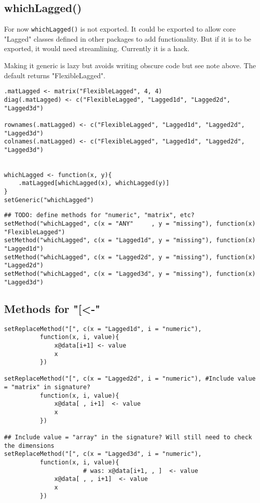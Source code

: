 \documentclass[11pt,a4paper]{article}
\begin{document}
\subsection{whichLagged()}
\label{sec:orgeae8383}

For now \texttt{whichLagged()} is not exported. It could be exported to allow core "Lagged" classes
defined in other packages to add functionality. But if it is to be exported, it would need
streamlining. Currently it is a hack.

Making it generic is lazy but avoids writing obscure code but see note above.
The default returns "FlexibleLagged".
\begin{verbatim}
.matLagged <- matrix("FlexibleLagged", 4, 4)
diag(.matLagged) <- c("FlexibleLagged", "Lagged1d", "Lagged2d", "Lagged3d")

rownames(.matLagged) <- c("FlexibleLagged", "Lagged1d", "Lagged2d", "Lagged3d")
colnames(.matLagged) <- c("FlexibleLagged", "Lagged1d", "Lagged2d", "Lagged3d")


whichLagged <- function(x, y){
    .matLagged[whichLagged(x), whichLagged(y)]
}
setGeneric("whichLagged")
\end{verbatim}

\begin{verbatim}
## TODO: define methods for "numeric", "matrix", etc?
setMethod("whichLagged", c(x = "ANY"     , y = "missing"), function(x) "FlexibleLagged")
setMethod("whichLagged", c(x = "Lagged1d", y = "missing"), function(x) "Lagged1d")
setMethod("whichLagged", c(x = "Lagged2d", y = "missing"), function(x) "Lagged2d")
setMethod("whichLagged", c(x = "Lagged3d", y = "missing"), function(x) "Lagged3d")
\end{verbatim}


\subsection{Methods for "[<-"}
\label{sec:orgfad94c7}

\begin{verbatim}
setReplaceMethod("[", c(x = "Lagged1d", i = "numeric"),
          function(x, i, value){
              x@data[i+1] <- value
              x
          })

setReplaceMethod("[", c(x = "Lagged2d", i = "numeric"), #Include value = "matrix" in signature?
          function(x, i, value){
              x@data[ , i+1]  <- value
              x
          })

## Include value = "array" in the signature? Will still need to check the dimensions
setReplaceMethod("[", c(x = "Lagged3d", i = "numeric"),
          function(x, i, value){
                      # was: x@data[i+1, , ]  <- value
              x@data[ , , i+1]  <- value
              x
          })
\end{verbatim}
\end{document}
